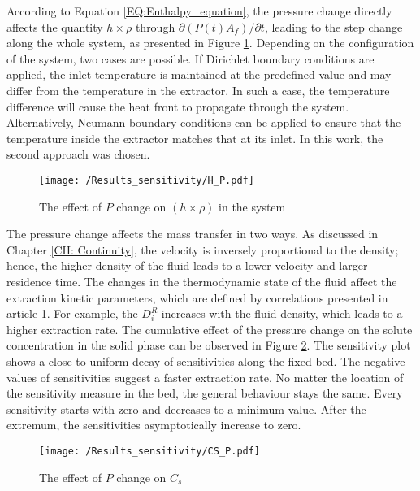 \documentclass[../Article_Design_of_Experiment.tex]{subfiles}
\begin{document}
	According to Equation \ref{EQ:Enthalpy_equation}, the pressure change directly affects the quantity $h \times \rho$ through $\partial (P(t) A_f) / \partial t$, leading to the step change along the whole system, as presented in Figure \ref{fig:Sensitivty_P_H}. Depending on the configuration of the system, two cases are possible. If Dirichlet boundary conditions are applied, the inlet temperature is maintained at the predefined value and may differ from the temperature in the extractor. In such a case, the temperature difference will cause the heat front to propagate through the system. Alternatively, Neumann boundary conditions can be applied to ensure that the temperature inside the extractor matches that at its inlet. In this work, the second approach was chosen.
    
    \begin{figure}[h!]
    	\centering
    	\texttt{[image: /Results\_sensitivity/H\_P.pdf]}
    	\caption{The effect of $P$ change on $(h \times \rho)$ in the system}
    	\label{fig:Sensitivty_P_H}
    \end{figure}

	The pressure change affects the mass transfer in two ways. As discussed in Chapter \ref{CH: Continuity}, the velocity is inversely proportional to the density; hence, the higher density of the fluid leads to a lower velocity and larger residence time. The changes in the thermodynamic state of the fluid affect the extraction kinetic parameters, which are defined by correlations presented in {\color{red}article 1}. For example, the $D_i^R$ increases with the fluid density, which leads to a higher extraction rate. The cumulative effect of the pressure change on the solute concentration in the solid phase can be observed in Figure \ref{fig:Sensitivty_P_CS}. The sensitivity plot shows a close-to-uniform decay of sensitivities along the fixed bed. The negative values of sensitivities suggest a faster extraction rate. No matter the location of the sensitivity measure in the bed, the general behaviour stays the same. Every sensitivity starts with zero and decreases to a minimum value. After the extremum, the sensitivities asymptotically increase to zero.

	\begin{figure}[h!]
		\centering
		\texttt{[image: /Results\_sensitivity/CS\_P.pdf]}
		\caption{The effect of $P$ change on $C_s$}
		\label{fig:Sensitivty_P_CS}
	\end{figure}
\end{document}
